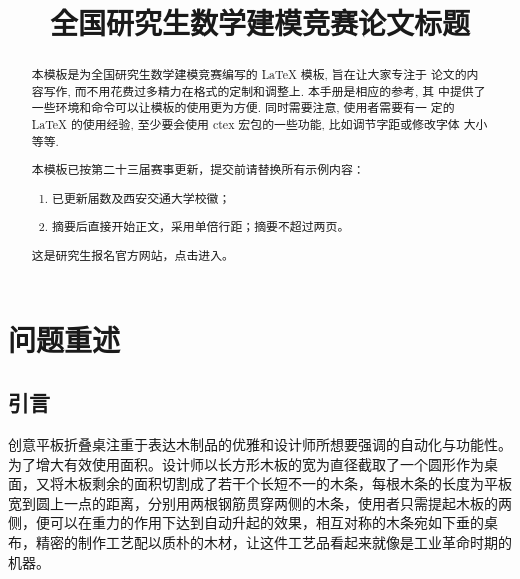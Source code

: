\documentclass[bwprint]{gmcmthesis}
\title{全国研究生数学建模竞赛论文标题}
\begin{document}
 \maketitle

\begin{abstract}
本模板是为全国研究生数学建模竞赛编写的 \LaTeX{} 模板, 旨在让大家专注于
论文的内容写作, 而不用花费过多精力在格式的定制和调整上. 本手册是相应的参考, 其
中提供了一些环境和命令可以让模板的使用更为方便. 同时需要注意, 使用者需要有一
定的 \LaTeX{} 的使用经验, 至少要会使用 ctex 宏包的一些功能, 比如调节字距或修改字体
大小等等.

\begin{mdframed}[%
roundcorner=5pt,linecolor=gray!50,outerlinewidth=0.5pt,
middlelinewidth=0.3pt,backgroundcolor=gray!2,
innertopmargin=\topskip, frametitle={2026年模板使用说明},
frametitlefont= \bfseries,frametitlerule=true,frametitlealignment =\raggedright\noindent,
frametitlerulewidth=.5pt, frametitlebackgroundcolor=gray!2,]
本模板已按第二十三届赛事更新，提交前请替换所有示例内容：
\begin{enumerate}
\item 已更新届数及西安交通大学校徽；
\item 摘要后直接开始正文，采用单倍行距；摘要不超过两页。
\end{enumerate}
\end{mdframed}

这是研究生报名官方网站，点击\href{https://cpipc.chinadegrees.cn}{}进入。



\end{abstract}

\pagestyle{plain}


\clearpage

\section{问题重述}

\subsection{引言}   %

创意平板折叠桌注重于表达木制品的优雅和设计师所想要强调的自动化与功能性。为了增大有效使用面积。设计师以长方形木板的宽为直径截取了一个圆形作为桌面，又将木板剩余的面积切割成了若干个长短不一的木条，每根木条的长度为平板宽到圆上一点的距离，分别用两根钢筋贯穿两侧的木条，使用者只需提起木板的两侧，便可以在重力的作用下达到自动升起的效果，相互对称的木条宛如下垂的桌布，精密的制作工艺配以质朴的木材，让这件工艺品看起来就像是工业革命时期的机器。
\end{document}
